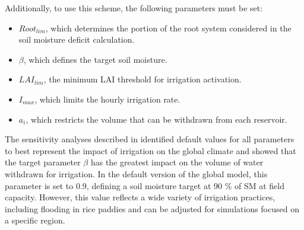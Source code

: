 Additionally, to use this scheme, the following parameters must be set:
\begin{itemize}
    \item $Root_{lim}$, which determines the portion of the root system considered in the soil moisture deficit calculation.
    \item $\beta$, which defines the target soil moisture.
    \item $LAI_{lim}$, the minimum LAI threshold for irrigation activation.
    \item $I_{max}$, which limits the hourly irrigation rate.
    \item $a_i$, which restricts the volume that can be withdrawn from each reservoir.
\end{itemize}

The sensitivity analyses described in \citet{arboleda-obando_validation_2024} identified default values for all parameters to best represent the impact of irrigation on the global climate and showed that the target parameter $\beta$ has the greatest impact on the volume of water withdrawn for irrigation.
In the default version of the global model, this parameter is set to 0.9, defining a soil moisture target at 90 \% of SM at field capacity. However, this value reflects a wide variety of irrigation practices, including flooding in rice paddies and can be adjusted for simulations focused on a specific region. %

